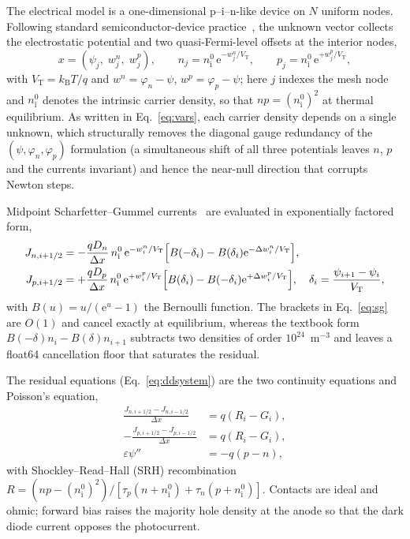 \documentclass[preprint,12pt]{elsarticle}
\newcommand{\ee}{\mathrm{e}}
\newcommand{\kb}{k_{\mathrm{B}}}
\newcommand{\Vt}{V_{\mathrm T}}
\begin{document}
The electrical model is a one-dimensional p--i--n-like device on $N$ uniform
nodes. Following standard semiconductor-device
practice~\cite{bank1983, selberherr1984}, the unknown vector collects the
electrostatic potential and two quasi-Fermi-level offsets at the interior
nodes,
\begin{equation}
  x=(\psi_j,\; w^{n}_j,\; w^{p}_j),\qquad
  n_j = n_{\mathrm{i}}^{0}\,\ee^{-w^{n}_j/\Vt},\qquad
  p_j = n_{\mathrm{i}}^{0}\,\ee^{+w^{p}_j/\Vt},
  \label{eq:vars}
\end{equation}
with $\Vt=\kb T/q$ and $w^{n}=\varphi_n-\psi$, $w^{p}=\varphi_p-\psi$; here $j$ indexes the mesh node and $n_{\mathrm{i}}^{0}$ denotes the intrinsic carrier density, so that $np=(n_{\mathrm{i}}^{0})^2$ at thermal equilibrium. As written in Eq.~\eqref{eq:vars}, each
carrier density depends on a single unknown, which structurally removes the
diagonal gauge redundancy of the $(\psi,\varphi_n,\varphi_p)$ formulation
(a simultaneous shift of all three potentials leaves $n$, $p$ and the
currents invariant) and hence the near-null direction that corrupts Newton
steps.

Midpoint Scharfetter--Gummel currents~\cite{scharfetter1969} are evaluated in
exponentially factored form,
\begin{equation}
\begin{aligned}
  J_{n,i+1/2} &= -\frac{q D_n}{\Delta x}\, n_{\mathrm{i}}^{0}\,\ee^{-w^{n}_i/\Vt}
     \Bigl[B(-\delta_i)-B(\delta_i)\ee^{-\Delta w^{n}_i/\Vt}\Bigr],\\
  J_{p,i+1/2} &= +\frac{q D_p}{\Delta x}\, n_{\mathrm{i}}^{0}\,\ee^{+w^{p}_i/\Vt}
     \Bigl[B(\delta_i)-B(-\delta_i)\ee^{+\Delta w^{p}_i/\Vt}\Bigr],
  \quad \delta_i=\frac{\psi_{i+1}-\psi_i}{\Vt},
\end{aligned}
  \label{eq:sg}
\end{equation}
with $B(u)=u/(\ee^{u}-1)$ the Bernoulli function. The brackets in
Eq.~\eqref{eq:sg} are $O(1)$ and cancel exactly at equilibrium, whereas
the textbook form
$B(-\delta)n_i-B(\delta)n_{i+1}$ subtracts two densities of order
$10^{24}$~m$^{-3}$ and leaves a float64 cancellation floor that saturates the
residual.

The residual equations (Eq.~\eqref{eq:ddsystem}) are the two continuity
equations and Poisson's equation,
\begin{equation}
\begin{aligned}
  \frac{J_{n,i+1/2}-J_{n,i-1/2}}{\Delta x} &= q(R_i-G_i),\\
  -\frac{J_{p,i+1/2}-J_{p,i-1/2}}{\Delta x} &= q(R_i-G_i),\\
  \varepsilon\psi'' &= -q(p-n),
\end{aligned}
  \label{eq:ddsystem}
\end{equation}
with Shockley--Read--Hall (SRH) recombination
$R=(np-(n_{\mathrm{i}}^{0})^2)/[\tau_p(n+n_{\mathrm{i}}^{0})+\tau_n(p+n_{\mathrm{i}}^{0})]$. Contacts are ideal and ohmic;
forward bias raises the majority hole density at the anode so that the dark
diode current opposes the photocurrent.
\end{document}
